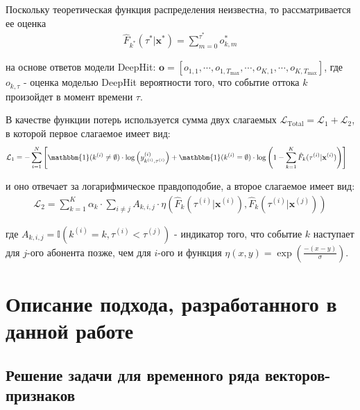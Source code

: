 \documentclass[a4paper,14pt,oneside,openany]{memoir}
\begin{document}
Поскольку теоретическая функция распределения неизвестна, то рассматривается ее оценка 
\begin{equation}
	\begin{aligned}
		\hat{F}_{k^*}(\tau^*|\mathbf{x}^*)=\sum_{m=0}^{\tau^*}o_{k,m}^*
	\end{aligned}
\end{equation}

на основе ответов модели DeepHit: $\mathbf{o}=[o_{1,1},\cdots,o_{1,T_{\max}},\cdots,o_{K,1},\cdots,o_{K,T_{\max}}]$, где $o_{k,\tau}$ - оценка моделью DeepHit вероятности того, что событие оттока $k$ произойдет в момент времени $\tau$.

В качестве функции потерь используется сумма двух слагаемых $\mathcal{L}_{\mathrm{Total}}=\mathcal{L}_1+\mathcal{L}_2$, в которой первое слагаемое имеет вид: 
\begin{equation}
	\begin{aligned}
		\mathcal{L}_{1} & = -\sum_{i=1}^N \left[\mathbbm{1}(k^{(i)}\neq\emptyset)\cdot\log\left(y_{k^{(i)},\tau^{(i)}}^{(i)}\right)  + \mathbbm{1}(k^{(i)}=\emptyset)\cdot\log\left(1-\sum_{k=1}^K\hat{F}_k(\tau^{(i)}|\mathbf{x}^{(i)})\right)\right]
	\end{aligned}
\end{equation}

и оно отвечает за логарифмическое правдоподобие, а второе слагаемое имеет вид: 
\begin{equation}
	\begin{aligned}
		\mathcal{L}_2=\sum_{k=1}^K\alpha_k\cdot\sum_{i\neq j}A_{k,i,j}\cdot\eta\left(\hat{F}_k(\tau^{(i)}|\mathbf{x}^{(i)}),\hat{F}_k(\tau^{(i)}|\mathbf{x}^{(j)})\right)
	\end{aligned}
\end{equation}

где $A_{k,i,j} = \mathbb{I}(k^{(i)}=k,\tau^{(i)}<\tau^{(j)})$ - индикатор того, что событие $k$ наступает для $j$-ого абонента позже, чем для $i$-ого и функция
$\eta(x,y)=\exp\left(\frac{-(x-y)}{\sigma}\right)$. 

\chapter{Описание подхода, разработанного в данной работе}


\section{Решение задачи для временного ряда векторов-признаков}
\end{document}
